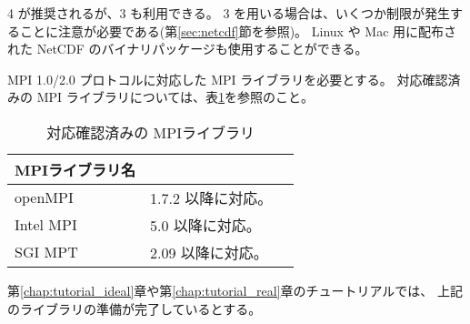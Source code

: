 {\netcdf}4 が推奨されるが、{\netcdf}3 も利用できる。
{\netcdf}3 を用いる場合は、いくつか制限が発生することに注意が必要である(第\ref{sec:netcdf}節を参照)。
Linux や Mac 用に配布された NetCDF のバイナリパッケージも使用することができる。


MPI 1.0/2.0 プロトコルに対応した MPI ライブラリを必要とする。
対応確認済みの MPI ライブラリについては、表\ref{tab:compatible_mpi}を参照のこと。

\begin{table}[htb]
\begin{center}
\caption{対応確認済みの MPIライブラリ}
\begin{tabularx}{150mm}{|l|X|X|} \hline
 \rowcolor[gray]{0.9} MPIライブラリ名 & \\ \hline
 openMPI   & 1.7.2 以降に対応。 \\ \hline
 Intel MPI & 5.0 以降に対応。 \\ \hline
 SGI MPT   & 2.09 以降に対応。 \\ \hline
\end{tabularx}
\label{tab:compatible_mpi}
\end{center}
\end{table}


第\ref{chap:tutorial_ideal}章や第\ref{chap:tutorial_real}章のチュートリアルでは、
上記のライブラリの準備が完了しているとする。

